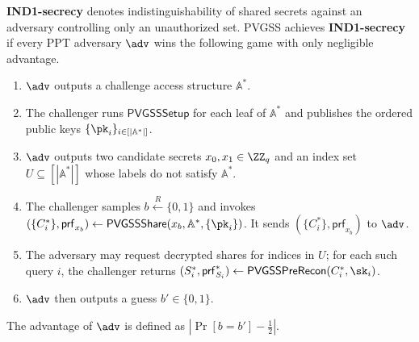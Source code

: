 \documentclass[runningheads]{llncs}
\newcommand{\pvgssSetup}{\mathsf{PVGSSSetup}}
\newcommand{\pvgssShare}{\mathsf{PVGSSShare}}
\newcommand{\pvgssPreRecon}{\mathsf{PVGSSPreRecon}}
\newcommand{\proofs}{\mathsf{prf}}
\begin{document}
\begin{definition}\label{def:ind1secrecy}
    \textbf{IND1-secrecy} denotes indistinguishability of shared secrets against an adversary controlling only an unauthorized set. PVGSS achieves \textbf{IND1-secrecy} if every PPT adversary $\adv$ wins the following game with only negligible advantage.
    \begin{enumerate}
        \item $\adv$ outputs a challenge access structure $\mathbb{A}^*$.
        \item The challenger runs $\pvgssSetup$ for each leaf of $\mathbb{A}^*$ and publishes the ordered public keys $\{\pk_i\}_{i\in[|\mathbb{A}^*|]}$.
        \item $\adv$ outputs two candidate secrets $x_0,x_1\in\ZZ_q$ and an index set $U\subseteq [|\mathbb{A}^*|]$ whose labels do not satisfy $\mathbb{A}^*$.
        \item The challenger samples $b \xleftarrow{R} \{0,1\}$ and invokes $(\{C^*_i\},\proofs_{x_b}) \gets \pvgssShare(x_b,\mathbb{A}^*,\{\pk_i\})$. It sends $(\{C^*_i\},\proofs_{x_b})$ to $\adv$.
        \item The adversary may request decrypted shares for indices in $U$; for each such query $i$, the challenger returns $(S_i^*,\proofs_{S_i}^*)\gets\pvgssPreRecon(C_i^*,\sk_i)$.
        \item $\adv$ then outputs a guess $b' \in \{0,1\}$.
    \end{enumerate}
    The advantage of $\adv$ is defined as $|\Pr[b = b'] - \frac{1}{2}|$.
\end{definition}
\end{document}

